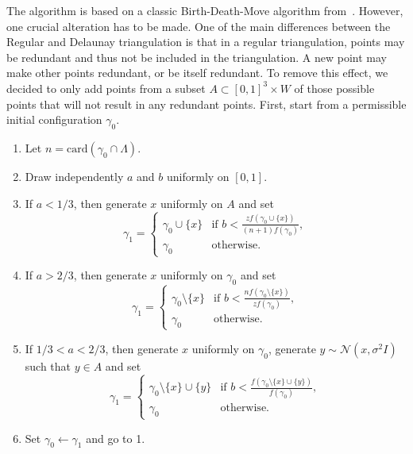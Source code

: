 \documentclass[12pt,a4paper]{report}
\begin{document}
The algorithm is based on a classic  Birth-Death-Move algorithm from~\cite{moller-waagepetersen:2003}. However, one crucial alteration has to be made. One of the main differences between the Regular and Delaunay triangulation is that in a regular triangulation, points may be redundant and thus not be included in the triangulation. A new point may make other points redundant, or be itself redundant. To remove this effect,  we decided to only add points from a subset $A \subset [0,1]^3\times W$ of those possible points that will not result in any redundant points. \newline
First, start from a permissible initial configuration $\gamma_0$.
\begin{enumerate}
    \item Let $n = \text{card}(\gamma_0 \cap \Lambda)$.
    \item Draw independently $a$ and $b$ uniformly on $[0,1]$.
    \item If $a<1/3$, then generate $x$ uniformly on $A$ and set
        $$\gamma_1 = 
        \left\{
            \begin{array}{ll}
                \gamma_0 \cup \{x\} & \mbox{if }  b < \frac{z f(\gamma_0 \cup \{x\})}{(n+1)f(\gamma_0)}, \\
                \gamma_0 & \mbox{otherwise. }
            \end{array}
        \right. $$
    \item If $a>2/3$, then generate $x$ uniformly on $\gamma_0$ and set
        $$\gamma_1 = 
        \left\{
            \begin{array}{ll}
                \gamma_0 \setminus \{x\} & \mbox{if }  b < \frac{n f(\gamma_0 \setminus \{x\})}{zf(\gamma_0)}, \\
                \gamma_0 & \mbox{otherwise. }
            \end{array}
        \right. $$
    \item If $1/3 < a < 2/3$, then generate $x$ uniformly on $\gamma_0$, generate $y\sim \mathcal N (x, \sigma^2 I)$ such that $y \in A$ and set
        $$\gamma_1 = 
        \left\{
            \begin{array}{ll}
                \gamma_0 \setminus \{x\} \cup \{y\} & \mbox{if }  b < \frac{f(\gamma_0 \setminus \{x\} \cup \{y\})}{f(\gamma_0)}, \\
                \gamma_0 & \mbox{otherwise. }
            \end{array}
        \right. $$
    \item Set $\gamma_0 \leftarrow \gamma_1$ and go to 1.
\end{enumerate}
\end{document}
